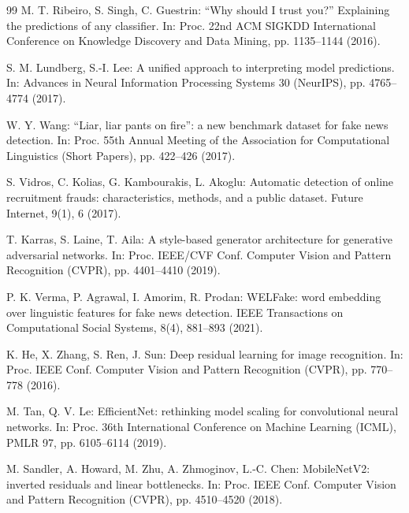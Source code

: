 \documentclass[runningheads]{llncs}
\begin{document}
\begin{thebibliography}{99}
M. T. Ribeiro, S. Singh, C. Guestrin: ``Why should I trust you?'' Explaining the predictions of any classifier. In: Proc. 22nd ACM SIGKDD International Conference on Knowledge Discovery and Data Mining, pp. 1135--1144 (2016).

S. M. Lundberg, S.-I. Lee: A unified approach to interpreting model predictions. In: Advances in Neural Information Processing Systems 30 (NeurIPS), pp. 4765--4774 (2017).

W. Y. Wang: ``Liar, liar pants on fire'': a new benchmark dataset for fake news detection. In: Proc. 55th Annual Meeting of the Association for Computational Linguistics (Short Papers), pp. 422--426 (2017).

S. Vidros, C. Kolias, G. Kambourakis, L. Akoglu: Automatic detection of online recruitment frauds: characteristics, methods, and a public dataset. Future Internet, 9(1), 6 (2017).

T. Karras, S. Laine, T. Aila: A style-based generator architecture for generative adversarial networks. In: Proc. IEEE/CVF Conf. Computer Vision and Pattern Recognition (CVPR), pp. 4401--4410 (2019).

P. K. Verma, P. Agrawal, I. Amorim, R. Prodan: WELFake: word embedding over linguistic features for fake news detection. IEEE Transactions on Computational Social Systems, 8(4), 881--893 (2021).

K. He, X. Zhang, S. Ren, J. Sun: Deep residual learning for image recognition. In: Proc. IEEE Conf. Computer Vision and Pattern Recognition (CVPR), pp. 770--778 (2016).

M. Tan, Q. V. Le: EfficientNet: rethinking model scaling for convolutional neural networks. In: Proc. 36th International Conference on Machine Learning (ICML), PMLR 97, pp. 6105--6114 (2019).

M. Sandler, A. Howard, M. Zhu, A. Zhmoginov, L.-C. Chen: MobileNetV2: inverted residuals and linear bottlenecks. In: Proc. IEEE Conf. Computer Vision and Pattern Recognition (CVPR), pp. 4510--4520 (2018).

\end{thebibliography}
\end{document}

